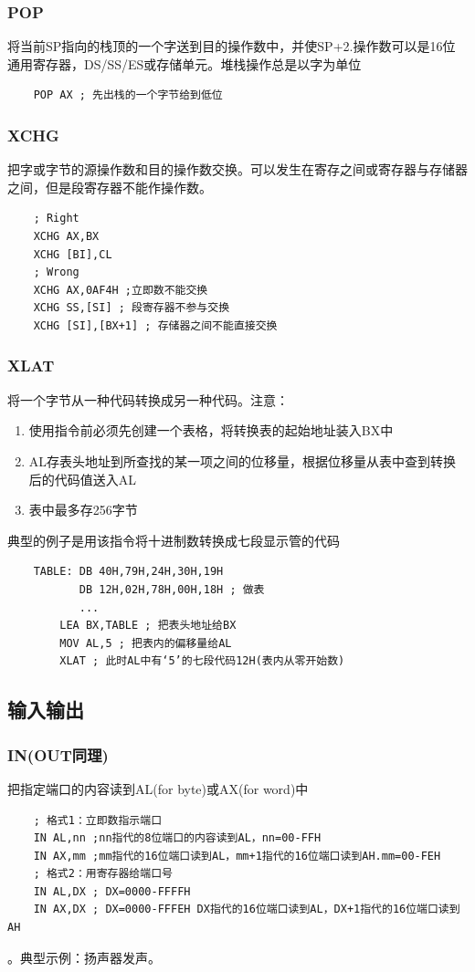 \subsubsection{POP}
将当前SP指向的栈顶的一个字送到目的操作数中，并使SP+2.操作数可以是16位通用寄存器，DS/SS/ES或存储单元。{\color{red}堆栈操作总是以字为单位}
\begin{lstlisting}
    POP AX ; 先出栈的一个字节给到低位
\end{lstlisting}
\subsubsection{XCHG}
把字或字节的源操作数和目的操作数交换。可以发生在寄存之间或寄存器与存储器之间，但是段寄存器不能作操作数。
\begin{lstlisting}
    ; Right
    XCHG AX,BX
    XCHG [BI],CL 
    ; Wrong
    XCHG AX,0AF4H ;立即数不能交换
    XCHG SS,[SI] ; 段寄存器不参与交换
    XCHG [SI],[BX+1] ; 存储器之间不能直接交换
\end{lstlisting}
\subsubsection{XLAT}
将一个字节从一种代码转换成另一种代码。注意：
\begin{enumerate}
    \item 使用指令前必须先创建一个表格，将转换表的起始地址装入BX中
    \item AL存表头地址到所查找的某一项之间的位移量，根据位移量从表中查到转换后的代码值送入AL
    \item 表中最多存256字节
\end{enumerate}
典型的例子是用该指令将十进制数转换成七段显示管的代码
\begin{lstlisting}
    TABLE: DB 40H,79H,24H,30H,19H
           DB 12H,02H,78H,00H,18H ; 做表
           ... 
        LEA BX,TABLE ; 把表头地址给BX
        MOV AL,5 ; 把表内的偏移量给AL
        XLAT ; 此时AL中有‘5’的七段代码12H(表内从零开始数)
\end{lstlisting}
\subsection{输入输出}
\subsubsection{IN(OUT同理)}
把指定端口的内容读到AL(for byte)或AX(for word)中
\begin{lstlisting}
    ; 格式1：立即数指示端口
    IN AL,nn ;nn指代的8位端口的内容读到AL，nn=00-FFH
    IN AX,mm ;mm指代的16位端口读到AL，mm+1指代的16位端口读到AH.mm=00-FEH
    ; 格式2：用寄存器给端口号
    IN AL,DX ; DX=0000-FFFFH
    IN AX,DX ; DX=0000-FFFEH DX指代的16位端口读到AL，DX+1指代的16位端口读到AH
\end{lstlisting}
{\color{red}{当口地址大于FFH时，必须用格式2}}。典型示例：扬声器发声。
